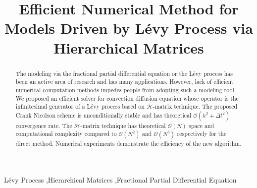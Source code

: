\documentclass[3p,,preprint,12pt]{elsarticle}
\theoremstyle{definition}
\begin{document}
\begin{frontmatter}

\title{Efficient Numerical Method for Models Driven by L\'evy Process via Hierarchical Matrices}

\begin{abstract}
	The modeling via the fractional partial differential equation or the L\'evy process has been an active area of research and has many applications. However, lack of efficient numerical computation methods impedes people from adopting such a modeling tool. We proposed an efficient solver for convection diffusion equation whose operator is the infinitesimal generator of a L\'evy process based on $\mathcal{H}$-matrix technique. The proposed Crank Nicolson scheme is unconditionally stable and has theoretical $\mathcal{O}(h^2+\Delta t^2)$ convergence rate. The $\mathcal{H}$-matrix technique has theoretical $\mathcal{O}(N)$ space and computational complexity compared to $\mathcal{O}(N^2)$ and $\mathcal{O}(N^3)$ respectively for the direct method. Numerical experiments demonstrate the efficiency of the new algorithm. 
\end{abstract}


	\begin{keyword}
L\'evy Process \sep Hierarchical Matrices \sep Fractional Partial Differential Equation


\end{keyword}

\end{frontmatter}
\end{document}
